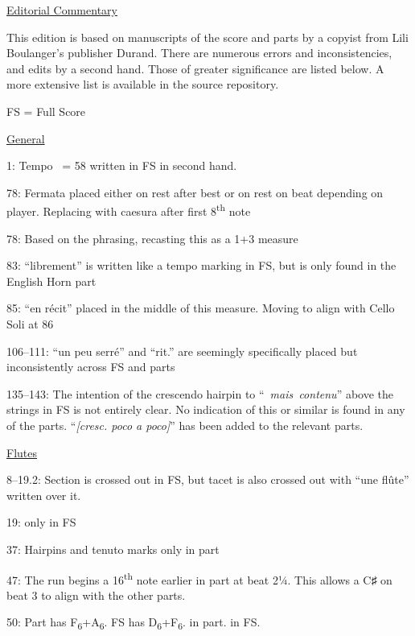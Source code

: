 \documentclass[twoside]{article}
\newcommand\dynmark[1]{\scalebox{0.9}{#1}{\kern1pt}}
\begin{document}
\begin{center}
\underline{\huge{Editorial Commentary}}
\end{center}

This edition is based on manuscripts of the score and parts by a copyist from Lili Boulanger's publisher Durand. There are numerous errors and inconsistencies, and edits by a second hand. Those of greater significance are listed below. A more extensive list is available in the source repository.

\begin{hangparas}{15pt}{1}
\bigbreak
FS = Full Score
\begin{multicols}{2}

\underline{General}

1: Tempo \quarternote\ = 58 written in FS in second hand.

78: Fermata placed either on rest after best or on rest on beat depending on player. Replacing with caesura after first 8\textsuperscript{th} note

78: Based on the phrasing, recasting this as a 1+3 measure

83: ``librement'' is written like a tempo marking in FS, but is only found in the English Horn part

85: ``en récit'' placed in the middle of this measure. Moving to align with Cello Soli at 86

106--111: ``un peu serré'' and ``rit.'' are seemingly specifically placed but inconsistently across FS and parts

135--143: The intention of the crescendo hairpin to \mbox{``\dynmark{\f} \textit{mais contenu}''} above the strings in FS is not entirely clear. No indication of this or similar is found in any of the parts. ``\textit{[cresc. poco a poco]}\hspace{1pt}'' has been added to the relevant parts.

\underline{Flutes}

8--19.2: Section is crossed out in FS, but tacet is also crossed out with ``une flûte'' written over it.

19: \dynmark{\p} only in FS

37: Hairpins and tenuto marks only in part

47: The run begins a 16\textsuperscript{th} note earlier in part at beat 2¼. This allows a C♯ on beat 3 to align with the other parts.

50: Part has F\textsubscript{6}+A\textsubscript{6}. FS has D\textsubscript{6}+F\textsubscript{6}. \dynmark{\ff} in part. \dynmark{\f} in FS.


\end{multicols}
\end{hangparas}
\end{document}
